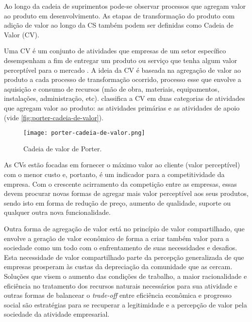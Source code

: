 	Ao longo da cadeia de suprimentos pode-se observar processos que agregam valor ao produto em desenvolvimento. As etapas de transformação do produto com adição de valor ao longo da CS também podem ser definidas como Cadeia de Valor (CV).
	
	Uma CV é um conjunto de atividades que empresas de um setor específico desempenham a fim de entregar um produto ou serviço que tenha algum valor perceptível para o mercado \cite{porter1985competitiveadvantage}. A ideia da CV é baseada na agregação de valor ao produto a cada processo de transformação ocorrido, processo esse que envolve a aquisição e consumo de recursos (mão de obra, materiais, equipamentos, instalações, administração, etc).  classifica a CV em duas categorias de atividades que agregam valor ao produto: as atividades primárias e as atividades de apoio (vide \autoref{fig:porter-cadeia-de-valor}).
	
	\begin{figure}[htb]
		\centering
		\caption{Cadeia de valor de Porter.}
		\label{fig:porter-cadeia-de-valor}
		\texttt{[image: porter-cadeia-de-valor.png]}
	\end{figure}
	
	As CVs estão focadas em fornecer o máximo valor ao cliente (valor perceptível) com o menor custo e, portanto, é um indicador para a competitividade da empresa. Com o crescente acirramento da competição entre as empresas, essas devem procurar novas formas de agregar mais valor perceptível aos seus produtos, sendo isto em forma de redução de preço, aumento de qualidade, suporte ou qualquer outra nova funcionalidade.
	
	Outra forma de agregação de valor está no princípio de valor compartilhado, que envolve a geração de valor econômico de forma a criar também valor para a sociedade como um todo \cite{porter2011valorcompartilhado} com o enfrentamento de suas necessidades e desafios. Esta necessidade de valor compartilhado parte da percepção generalizada de que empresas prosperam às custas da depreciação da comunidade que as cercam. Soluções que visem o aumento das condições de trabalho, a maior racionalidade e eficiência no tratamento dos recursos naturais necessários para sua atividade e outras formas de balancear o \textit{trade-off} entre eficiência econômica e progresso social são estratégias para se recuperar a legitimidade e a percepção de valor pela sociedade da atividade empresarial.
	
